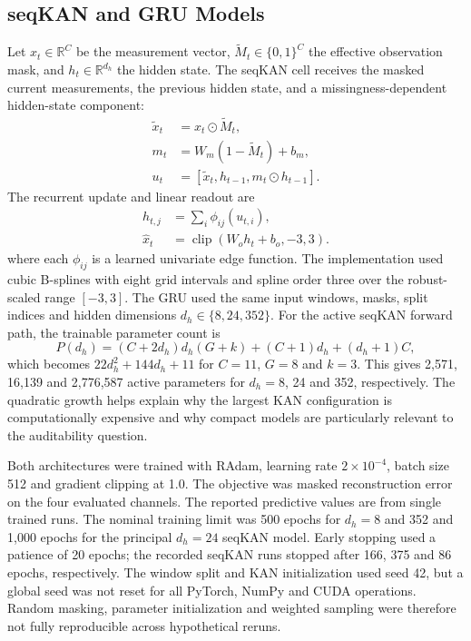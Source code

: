 \documentclass[conference]{IEEEtran}
\begin{document}
\subsection{seqKAN and GRU Models}
Let $x_t\in\mathbb{R}^{C}$ be the measurement vector,
$\tilde{M}_t\in\{0,1\}^{C}$ the effective observation mask,
and $h_t\in\mathbb{R}^{d_h}$ the hidden state. The seqKAN
cell receives the masked current measurements, the previous
hidden state, and a missingness-dependent hidden-state component:
\begin{equation}
\begin{aligned}
\widetilde{x}_t
    &= x_t \odot \widetilde{M}_t,\\
m_t
    &= W_m(1-\widetilde{M}_t)+b_m,\\
u_t
    &= [\widetilde{x}_t,h_{t-1},
        m_t\odot h_{t-1}].
\end{aligned}
\label{eq:input}
\end{equation}
The recurrent update and linear readout are
\begin{equation}
\begin{aligned}
h_{t,j} &= \sum_i \phi_{ij}(u_{t,i}),\\
\hat{x}_t
    &= \operatorname{clip}
       (W_o h_t+b_o,-3,3).
\end{aligned}
\label{eq:kan}
\end{equation}
where each $\phi_{ij}$ is a learned univariate edge function. The implementation used cubic B-splines with eight grid intervals and spline order three over the robust-scaled range $[-3,3]$. The GRU used the same input windows, masks, split indices and hidden dimensions $d_h\in\{8,24,352\}$. For the active seqKAN forward path, the trainable parameter count is
\begin{equation}
P(d_h)=(C+2d_h)d_h(G+k)+(C+1)d_h+(d_h+1)C,
\label{eq:params}
\end{equation}
which becomes $22d_h^2+144d_h+11$ for $C=11$, $G=8$ and $k=3$. This gives 2,571, 16,139 and 2,776,587 active parameters for $d_h=8$, 24 and 352, respectively. The quadratic growth helps explain why the largest KAN configuration is computationally expensive and why compact models are particularly relevant to the auditability question.

Both architectures were trained with RAdam, learning rate $2\times10^{-4}$, batch size 512 and gradient clipping at 1.0. The objective was masked reconstruction error on the four evaluated channels. The reported predictive values are from single trained runs. The nominal training limit was 500 epochs for $d_h=8$ and 352 and 1,000 epochs for the principal $d_h=24$ seqKAN model. Early stopping used a patience of 20 epochs; the recorded seqKAN runs stopped after 166, 375 and 86 epochs, respectively. The window split and KAN initialization used seed 42, but a global seed was not reset for all PyTorch, NumPy and CUDA operations. Random masking, parameter initialization and weighted sampling were therefore not fully reproducible across hypothetical reruns.
\end{document}
